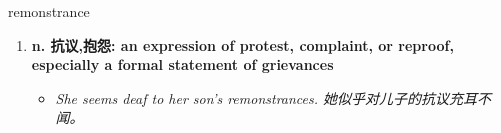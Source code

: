 
\begin{frame}
{\huge remonstrance}
\begin{center}
\begin{enumerate}\Large
  \item \textbf{n. 抗议,抱怨: an expression of protest, complaint, or reproof, especially a formal statement of grievances}
  \begin{itemize}
    \item \em{\Large{She seems deaf to her son’s remonstrances. 她似乎对儿子的抗议充耳不闻。}}
  \end{itemize}
\end{enumerate}
\end{center}
\end{frame}

